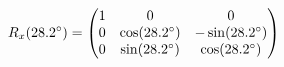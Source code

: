 \documentclass[preview]{standalone}
\begin{document}
\begin{align*}
\special{dvisvgm:raw <g id='unique000'>}R_x(28.2^\circ) = \begin{pmatrix} 1 & 0 & 0 \\ 0 & \cos(28.2^\circ) & -\sin(28.2^\circ) \\ 0 & \sin(28.2^\circ) & \cos(28.2^\circ) \end{pmatrix}\special{dvisvgm:raw </g>}
\end{align*}
\end{document}
